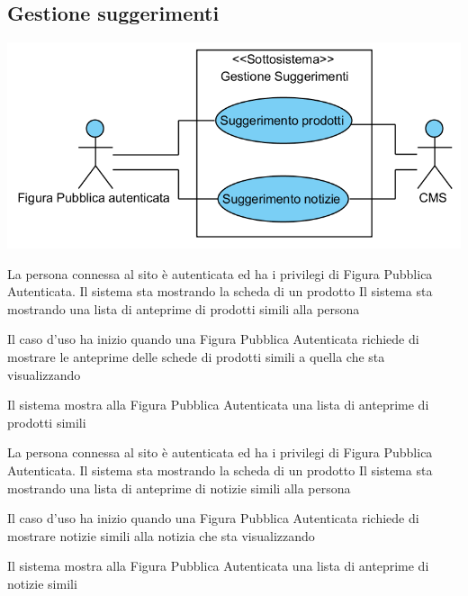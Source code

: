 \subsection{Gestione suggerimenti}
\begin{center}
   \includegraphics[width=\textwidth]{assets/visualParadigm/cu/GestioneSuggerimenti}
\end{center}
{}
{La persona connessa al sito è autenticata ed ha i privilegi di Figura Pubblica Autenticata. Il sistema sta mostrando la scheda di un prodotto}
{Il sistema sta mostrando una lista di anteprime di prodotti simili alla persona}
{\begin{enumCU}
	\item Il caso d'uso ha inizio quando una Figura Pubblica Autenticata richiede di mostrare le anteprime delle schede di prodotti simili a quella che sta visualizzando
	\item Il sistema mostra alla Figura Pubblica Autenticata una lista di anteprime di prodotti simili
\end{enumCU}}


{}
{La persona connessa al sito è autenticata ed ha i privilegi di Figura Pubblica Autenticata. Il sistema sta mostrando la scheda di un prodotto}
{Il sistema sta mostrando una lista di anteprime di notizie simili alla persona}
{\begin{enumCU}
	\item Il caso d'uso ha inizio quando una Figura Pubblica Autenticata richiede di mostrare notizie simili alla notizia che sta visualizzando
	\item Il sistema mostra alla Figura Pubblica Autenticata una lista di anteprime di notizie simili
\end{enumCU}}

